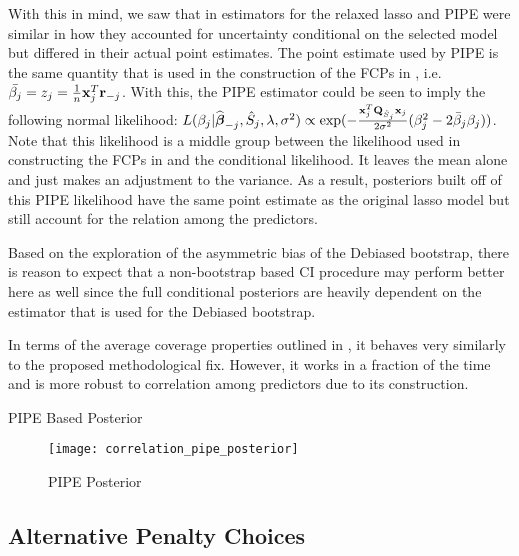 With this in mind, we saw that in  estimators for the relaxed lasso and PIPE were similar in how they accounted for uncertainty conditional on the selected model but differed in their actual point estimates. The point estimate used by PIPE is the same quantity that is used in the construction of the FCPs in , i.e. $\bar{\beta_j} = z_j = \frac{1}{n}\mathbf{x}_j^T\mathbf{r}_{-j}$. With this, the PIPE estimator could be seen to imply the following normal likelihood: $L(\beta_j|\widehat{\boldsymbol{\beta}}_{-j}, \hat{S}_j, \lambda, \sigma^2) \propto \exp(-\frac{\mathbf{x}_j^T \mathbf{Q}_{\hat{S}_j} \mathbf{x}_j}{2\sigma^2}(\beta_{j}^2 - 2 \bar{\beta}_{j} \beta_{j}))$. Note that this likelihood is a middle group between the likelihood used in constructing the FCPs in  and the conditional likelihood. It leaves the mean alone and just makes an adjustment to the variance. As a result, posteriors built off of this PIPE likelihood have the same point estimate as the original lasso model but still account for the relation among the predictors.

Based on the exploration of the asymmetric bias of the Debiased bootstrap, there is reason to expect that a non-bootstrap based CI procedure may perform better here as well since the full conditional posteriors are heavily dependent on the estimator that is used for the Debiased bootstrap.

In terms of the average coverage properties outlined in , it behaves very similarly to the proposed methodological fix. However, it works in a fraction of the time and is more robust to correlation among predictors due to its construction. 

\begin{table}[hbtp]
    \centering
    
    \caption{\label{Tab:dist_beta} PIPE Based Posterior}
\end{table}

\begin{figure}[hbtp]
    \begin{center}
    \texttt{[image: correlation\_pipe\_posterior]}
    \caption{\label{Fig:correlation_pipe_posterior} PIPE Posterior}
    \end{center}
\end{figure}
    
\subsection{Alternative Penalty Choices}

